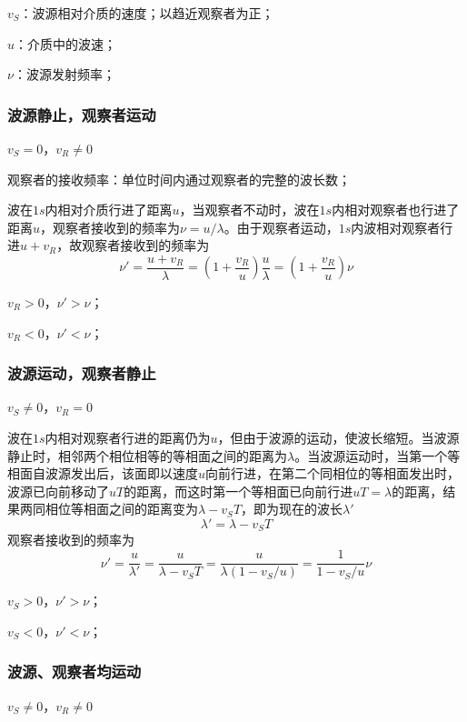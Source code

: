 \documentclass[12pt,a4paper]{article}
\begin{document}
$v_S$：波源相对介质的速度；以趋近观察者为正；

$u$：介质中的波速；

$\nu$：波源发射频率；

\subsubsection{波源静止，观察者运动}
$v_S = 0$，$v_R \neq 0$

观察者的接收频率：单位时间内通过观察者的完整的波长数；

波在$1s$内相对介质行进了距离$u$，当观察者不动时，波在$1s$内相对观察者也行进了距离$u$，观察者接收到的频率为$\nu = u/\lambda$。由于观察者运动，$1s$内波相对观察者行进$u+v_R$，故观察者接收到的频率为
\begin{equation}
\nu' = \frac{u+v_R}{\lambda} = \left(1+\frac{v_R}{u}  \right) \frac{u}{\lambda} = \left(1+\frac{v_R}{u}  \right) \nu
\end{equation}

$v_R > 0$，$\nu' > \nu$；

$v_R < 0$，$\nu' < \nu$；

\subsubsection{波源运动，观察者静止}
$v_S \neq 0$，$v_R = 0$

波在$1s$内相对观察者行进的距离仍为$u$，但由于波源的运动，使波长缩短。当波源静止时，相邻两个相位相等的等相面之间的距离为$\lambda$。当波源运动时，当第一个等相面自波源发出后，该面即以速度$u$向前行进，在第二个同相位的等相面发出时，波源已向前移动了$uT$的距离，而这时第一个等相面已向前行进$uT = \lambda$的距离，结果两同相位等相面之间的距离变为$\lambda -v_S T$，即为现在的波长$\lambda'$
\begin{equation}
\lambda' = \lambda - v_S T
\end{equation}
观察者接收到的频率为
\begin{equation}
\nu' = \frac{u}{\lambda'} = \frac{u}{\lambda -v_S T} =  \frac{u}{\lambda(1 -v_S/u)} = \frac{1}{1-v_S/u} \nu
\end{equation}

$v_S > 0$，$\nu' > \nu$；

$v_S < 0$，$\nu' < \nu$；

\subsubsection{波源、观察者均运动}
$v_S \neq 0$，$v_R \neq 0$
\end{document}
